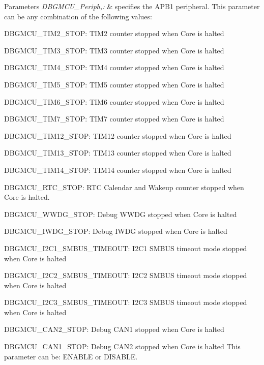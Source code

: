 \begin{DoxyParams}{Parameters}
{\em D\-B\-G\-M\-C\-U\-\_\-\-Periph,\-:} & specifies the A\-P\-B1 peripheral. This parameter can be any combination of the following values\-: \begin{DoxyItemize}
\item D\-B\-G\-M\-C\-U\-\_\-\-T\-I\-M2\-\_\-\-S\-T\-O\-P\-: T\-I\-M2 counter stopped when Core is halted \item D\-B\-G\-M\-C\-U\-\_\-\-T\-I\-M3\-\_\-\-S\-T\-O\-P\-: T\-I\-M3 counter stopped when Core is halted \item D\-B\-G\-M\-C\-U\-\_\-\-T\-I\-M4\-\_\-\-S\-T\-O\-P\-: T\-I\-M4 counter stopped when Core is halted \item D\-B\-G\-M\-C\-U\-\_\-\-T\-I\-M5\-\_\-\-S\-T\-O\-P\-: T\-I\-M5 counter stopped when Core is halted \item D\-B\-G\-M\-C\-U\-\_\-\-T\-I\-M6\-\_\-\-S\-T\-O\-P\-: T\-I\-M6 counter stopped when Core is halted \item D\-B\-G\-M\-C\-U\-\_\-\-T\-I\-M7\-\_\-\-S\-T\-O\-P\-: T\-I\-M7 counter stopped when Core is halted \item D\-B\-G\-M\-C\-U\-\_\-\-T\-I\-M12\-\_\-\-S\-T\-O\-P\-: T\-I\-M12 counter stopped when Core is halted \item D\-B\-G\-M\-C\-U\-\_\-\-T\-I\-M13\-\_\-\-S\-T\-O\-P\-: T\-I\-M13 counter stopped when Core is halted \item D\-B\-G\-M\-C\-U\-\_\-\-T\-I\-M14\-\_\-\-S\-T\-O\-P\-: T\-I\-M14 counter stopped when Core is halted \item D\-B\-G\-M\-C\-U\-\_\-\-R\-T\-C\-\_\-\-S\-T\-O\-P\-: R\-T\-C Calendar and Wakeup counter stopped when Core is halted. \item D\-B\-G\-M\-C\-U\-\_\-\-W\-W\-D\-G\-\_\-\-S\-T\-O\-P\-: Debug W\-W\-D\-G stopped when Core is halted \item D\-B\-G\-M\-C\-U\-\_\-\-I\-W\-D\-G\-\_\-\-S\-T\-O\-P\-: Debug I\-W\-D\-G stopped when Core is halted \item D\-B\-G\-M\-C\-U\-\_\-\-I2\-C1\-\_\-\-S\-M\-B\-U\-S\-\_\-\-T\-I\-M\-E\-O\-U\-T\-: I2\-C1 S\-M\-B\-U\-S timeout mode stopped when Core is halted \item D\-B\-G\-M\-C\-U\-\_\-\-I2\-C2\-\_\-\-S\-M\-B\-U\-S\-\_\-\-T\-I\-M\-E\-O\-U\-T\-: I2\-C2 S\-M\-B\-U\-S timeout mode stopped when Core is halted \item D\-B\-G\-M\-C\-U\-\_\-\-I2\-C3\-\_\-\-S\-M\-B\-U\-S\-\_\-\-T\-I\-M\-E\-O\-U\-T\-: I2\-C3 S\-M\-B\-U\-S timeout mode stopped when Core is halted \item D\-B\-G\-M\-C\-U\-\_\-\-C\-A\-N2\-\_\-\-S\-T\-O\-P\-: Debug C\-A\-N1 stopped when Core is halted \item D\-B\-G\-M\-C\-U\-\_\-\-C\-A\-N1\-\_\-\-S\-T\-O\-P\-: Debug C\-A\-N2 stopped when Core is halted This parameter can be\-: E\-N\-A\-B\-L\-E or D\-I\-S\-A\-B\-L\-E. \end{DoxyItemize}
\\
\hline
\end{DoxyParams}

